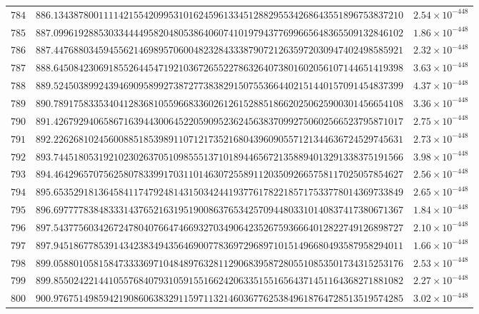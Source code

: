 \documentclass[12pt,reqno]{amsart}
\theoremstyle{remark}
\begin{document}
\begin{longtable}{clc}
$784$ & $886.1343878001111421554209953101624596133451288295534268643551896753837210$ & $2.54\times 10^{-448}$ \\
$785$ & $887.0996192885303344449582048053864060741019794377699665648365509132846102$ & $1.86\times 10^{-448}$ \\
$786$ & $887.4476880345945562146989570600482328433387907212635972030947402498585921$ & $2.32\times 10^{-448}$ \\
$787$ & $888.6450842306918552644547192103672655227863264073801602056107144651419398$ & $3.63\times 10^{-448}$ \\
$788$ & $889.5245038992439469095899273872773838291507553664402151440157091454837399$ & $4.37\times 10^{-448}$ \\
$789$ & $890.7891758335340412836810559668336026126152885186620250625900301456654108$ & $3.36\times 10^{-448}$ \\
$790$ & $891.4267929406586716394430064522059095236245638370992750602566523795871017$ & $2.75\times 10^{-448}$ \\
$791$ & $892.2262681024560088518539891107121735216804396090557121344636724529745631$ & $2.73\times 10^{-448}$ \\
$792$ & $893.7445180531921023026370510985551371018944656721358894013291338375191566$ & $3.98\times 10^{-448}$ \\
$793$ & $894.4642965707562580783399170311014630725589112035092665758117025057854627$ & $2.56\times 10^{-448}$ \\
$794$ & $895.6535291813645841174792481431503424419377617822185717533778014369733849$ & $2.65\times 10^{-448}$ \\
$795$ & $896.6977778384833314376521631951900863765342570944803310140837417380671367$ & $1.84\times 10^{-448}$ \\
$796$ & $897.5437756034267247804076647466932703490642352675936664012822749126898727$ & $2.10\times 10^{-448}$ \\
$797$ & $897.9451867785391434238349435646900778369729689710151496680493587958294011$ & $1.66\times 10^{-448}$ \\
$798$ & $899.0588010581584733336971048489763281129068395872805510853501734315253176$ & $2.53\times 10^{-448}$ \\
$799$ & $899.8550242214410557684079310591551662420633515516564371451164368271881082$ & $2.27\times 10^{-448}$ \\
$800$ & $900.9767514985942190860638329115971132146036776253849618764728513519574285$ & $3.02\times 10^{-448}$ \\

\end{longtable}
\end{document}
